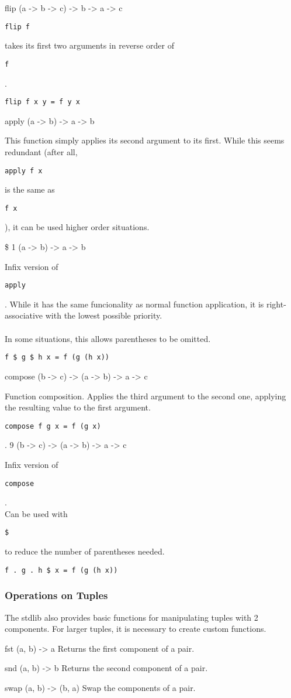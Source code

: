 \documentclass{article}
\def\code#1{\begin{footnotesize}\texttt{#1}\end{footnotesize}}
\begin{document}
\medskip

\libfunction
  {flip}
  {(a -> b -> c) -> b -> a -> c}
  {\code{flip f} takes its first two arguments in reverse order of \code{f}.

  \code{flip f x y = f y x}}

\libfunction
  {apply}
  {(a -> b) -> a -> b}
  {This function simply applies its second argument to its first.
  While this seems redundant (after all, \code{apply f x} is the same as \code{f x}), it can be used higher order situations.}

\liboperator
  {\$}
  {\rightassociative}
  {1}
  {(a -> b) -> a -> b}
  {Infix version of \code{apply}.
  While it has the same funcionality as normal function application, it is right-associative with the lowest possible priority.
  \\
  \\
  In some situations, this allows parentheses to be omitted.

  \code{f \$ g \$ h x  =  f (g (h x))}}

\libfunction
  {compose}
  {(b -> c) -> (a -> b) -> a -> c}
  {Function composition.
  Applies the third argument to the second one, applying the resulting value to the first argument.
  \\

  \code{compose f g x = f (g x)}}

\liboperator
  {.}
  {\rightassociative}
  {9}
  {(b -> c) -> (a -> b) -> a -> c}
  {Infix version of \code{compose}.
  \\
  Can be used with \code{\$} to reduce the number of parentheses needed.

  \code{f . g . h \$ x = f (g (h x))}}

\subsubsection{Operations on Tuples}

The stdlib also provides basic functions for manipulating tuples with 2 components.
For larger tuples, it is necessary to create custom functions.

\medskip

\libfunction
  {fst}
  {(a, b) -> a}
  {Returns the first component of a pair.}

\libfunction
  {snd}
  {(a, b) -> b}
  {Returns the second component of a pair.}

\libfunction
  {swap}
  {(a, b) -> (b, a)}
  {Swap the components of a pair.}
\end{document}
